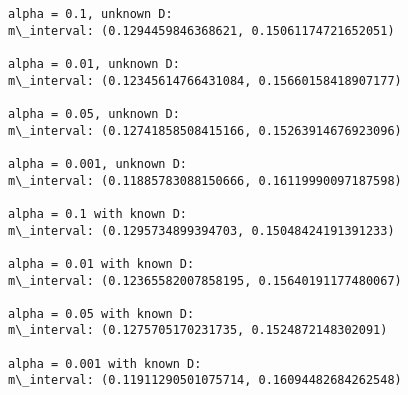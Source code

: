 \documentclass[11pt]{article}
\begin{document}
    \begin{Verbatim}[commandchars=\\\{\}]
alpha = 0.1, unknown D:
m\_interval: (0.1294459846368621, 0.15061174721652051)

alpha = 0.01, unknown D:
m\_interval: (0.12345614766431084, 0.15660158418907177)

alpha = 0.05, unknown D:
m\_interval: (0.12741858508415166, 0.15263914676923096)

alpha = 0.001, unknown D:
m\_interval: (0.11885783088150666, 0.16119990097187598)

alpha = 0.1 with known D:
m\_interval: (0.1295734899394703, 0.15048424191391233)

alpha = 0.01 with known D:
m\_interval: (0.12365582007858195, 0.15640191177480067)

alpha = 0.05 with known D:
m\_interval: (0.1275705170231735, 0.1524872148302091)

alpha = 0.001 with known D:
m\_interval: (0.11911290501075714, 0.16094482684262548)


    \end{Verbatim}

    \begin{center}
    \end{center}
    { \hspace*{\fill} \\}
    
\end{document}
